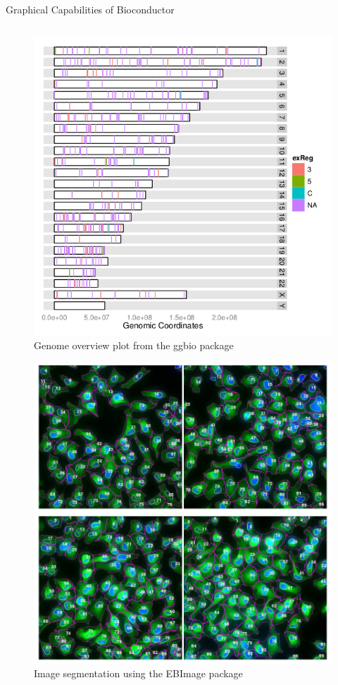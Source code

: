 \documentclass[final]{beamer}
\begin{document}
\begin{frame}[t]
\begin{columns}[t]
\begin{column}{0.48\linewidth}
\begin{block}{Graphical Capabilities of Bioconductor}
\begin{columns}[t]
\begin{column}{0.33\linewidth}
\begin{figure}
              \includegraphics[width=0.85\linewidth]{stacked-darn}
              \caption{Genome overview plot from the ggbio package}
            \end{figure}
            \begin{figure}
              \centering
              \includegraphics[width=0.85\linewidth]{ebimage}
              \caption{Image segmentation using the EBImage package}
            \end{figure}
          \end{column}

\end{columns}
\end{block}
\end{column}
\end{columns}
\end{frame}
\end{document}
